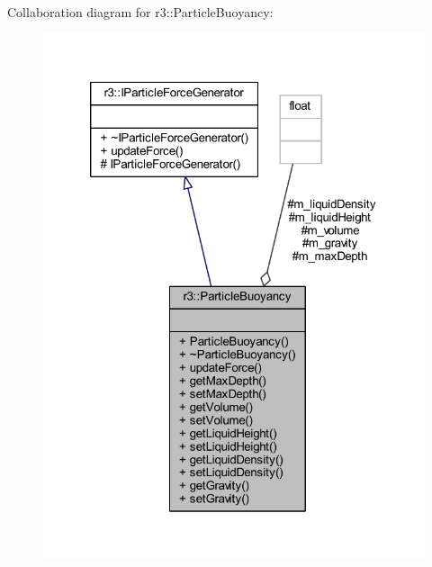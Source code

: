 Collaboration diagram for r3\+:\+:Particle\+Buoyancy\+:\nopagebreak
\begin{figure}[H]
\begin{center}
\leavevmode
\includegraphics[width=320pt]{classr3_1_1_particle_buoyancy__coll__graph}
\end{center}
\end{figure}
